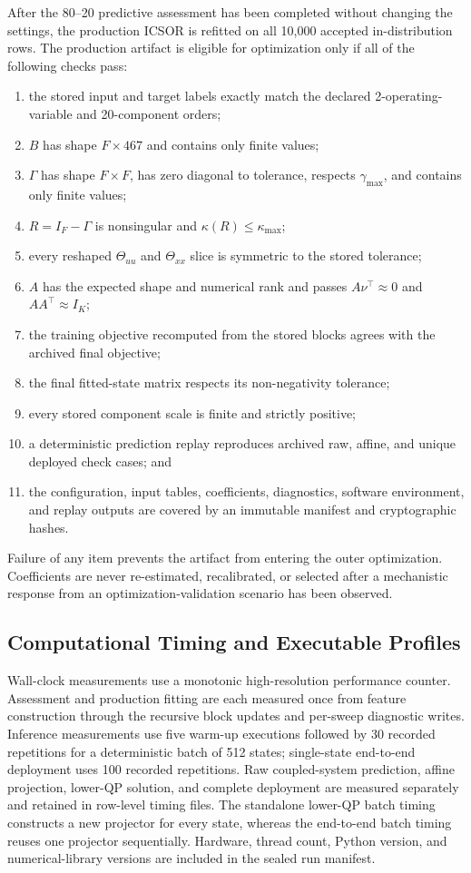 \documentclass[a4paper,fleqn]{cas-sc}
\begin{document}
After the 80--20 predictive assessment has been completed without changing the settings, the production ICSOR is refitted on all 10,000 accepted in-distribution rows. The production artifact is eligible for optimization only if all of the following checks pass:
\begin{enumerate}
\item the stored input and target labels exactly match the declared 2-operating-variable and 20-component orders;
\item $B$ has shape $F\times467$ and contains only finite values;
\item $\Gamma$ has shape $F\times F$, has zero diagonal to tolerance, respects $\gamma_{\max}$, and contains only finite values;
\item $R=I_F-\Gamma$ is nonsingular and $\kappa(R)\leq\kappa_{\max}$;
\item every reshaped $\Theta_{uu}$ and $\Theta_{xx}$ slice is symmetric to the stored tolerance;
\item $A$ has the expected shape and numerical rank and passes $A\nu^\top\approx0$ and $AA^\top\approx I_K$;
\item the training objective recomputed from the stored blocks agrees with the archived final objective;
\item the final fitted-state matrix respects its non-negativity tolerance;
\item every stored component scale is finite and strictly positive;
\item a deterministic prediction replay reproduces archived raw, affine, and unique deployed check cases; and
\item the configuration, input tables, coefficients, diagnostics, software environment, and replay outputs are covered by an immutable manifest and cryptographic hashes.
\end{enumerate}
Failure of any item prevents the artifact from entering the outer optimization. Coefficients are never re-estimated, recalibrated, or selected after a mechanistic response from an optimization-validation scenario has been observed.

\subsection{Computational Timing and Executable Profiles}

Wall-clock measurements use a monotonic high-resolution performance counter. Assessment and production fitting are each measured once from feature construction through the recursive block updates and per-sweep diagnostic writes. Inference measurements use five warm-up executions followed by 30 recorded repetitions for a deterministic batch of 512 states; single-state end-to-end deployment uses 100 recorded repetitions. Raw coupled-system prediction, affine projection, lower-QP solution, and complete deployment are measured separately and retained in row-level timing files. The standalone lower-QP batch timing constructs a new projector for every state, whereas the end-to-end batch timing reuses one projector sequentially. Hardware, thread count, Python version, and numerical-library versions are included in the sealed run manifest.
\end{document}
